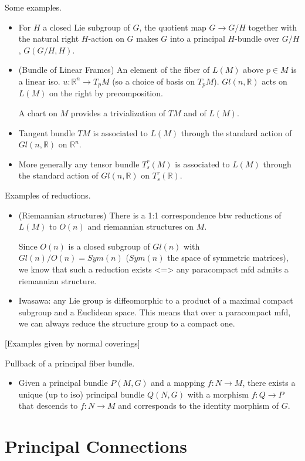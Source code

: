 \documentclass{report}
\theoremstyle{definition}
\begin{document}
Some examples.
\begin{itemize}
    \item For $H$ a closed Lie subgroup of $G$, the quotient map $G\to G/H$ together with the natural right $H$-action on $G$ makes $G$ into a principal $H$-bundle over $G/H$, $G(G/H,H)$.
    \item (Bundle of Linear Frames) An element of the fiber of $L(M)$ above $p\in M$ is a linear iso. $u:\mathbb{R}^n\to T_pM$ (so a choice of basis on $T_pM$). $Gl(n,\mathbb{R})$ acts on $L(M)$ on the right by precomposition.

    A chart on $M$ provides a trivialization of $TM$ and of $L(M)$.
    \item Tangent bundle $TM$ is associated to $L(M)$ through the standard action of $Gl(n,\mathbb{R})$ on $\mathbb{R}^n$.
    \item More generally any tensor bundle $T^r_s(M)$ is associated to $L(M)$ through the standard action of $Gl(n,\mathbb{R})$ on $T^r_s(\mathbb{R})$.
\end{itemize}

Examples of reductions.
\begin{itemize}
    \item (Riemannian structures) There is a 1:1 correspondence btw reductions of $L(M)$ to $O(n)$ and riemannian structures on $M$.

    Since $O(n)$ is a closed subgroup of $Gl(n)$ with $Gl(n)/O(n)=Sym(n)$ ($Sym(n)$ the space of symmetric matrices), we know that such a reduction exists <=> any paracompact mfd admits a riemannian structure.
    \item Iwasawa: any Lie group is diffeomorphic to a product of a maximal compact subgroup and a Euclidean space. This means that over a paracompact mfd, we can always reduce the structure group to a compact one.
\end{itemize}

[Examples given by normal coverings]

Pullback of a principal fiber bundle.
\begin{itemize}
    \item Given a principal bundle $P(M,G)$ and a mapping $f:N\to M$, there exists a unique (up to iso) principal bundle $Q(N,G)$ with a morphism $f:Q\to P$ that descends to $f:N\to M$ and corresponds to the identity morphism of $G$.
\end{itemize}

\chapter{Principal Connections}
\end{document}
